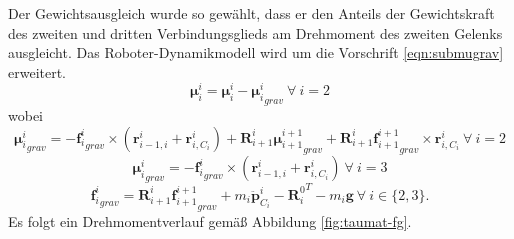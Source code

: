 %
Der Gewichtsausgleich wurde so gewählt, dass er den Anteils der Gewichtskraft des zweiten und dritten Verbindungsglieds am Drehmoment des zweiten Gelenks ausgleicht. 
Das Roboter-Dynamikmodell wird um die Vorschrift \ref{eqn:submugrav} erweitert.
%
\begin{equation}
	\label{eqn:submugrav}
\bm{\mu}^{i}_{i} = \bm{\mu}^{i}_{i} - {\bm{\mu}^{i}_{i}}_{grav} ~\forall ~i = 2
\end{equation}
%
wobei
%
\begin{equation}
	\label{eqn:mugrav}
	{\bm{\mu}^{i}_{i}}_{grav} = -{\bm{f}^{i}_{i}}_{grav} \times \left( \bm{r}^{i}_{i-1,i} + \bm{r}^{i}_{i,C_i} \right) + \bm{R}^{i}_{i+1} {\bm{\mu}^{i+1}_{i+1}}_{grav} + \bm{R}^{i}_{i+1} {\bm{f}^{i+1}_{i+1}}_{grav} \times \bm{r}^{i}_{i,C_i} ~\forall ~i = 2
\end{equation}
%
\begin{equation}
	\label{eqn:mugrav}
	{\bm{\mu}^{i}_{i}}_{grav} = -{\bm{f}^{i}_{i}}_{grav} \times \left( \bm{r}^{i}_{i-1,i} + \bm{r}^{i}_{i,C_i} \right) ~\forall ~i = 3
\end{equation}
%
\begin{equation}
	\label{eqn:subfgrav}
	{\bm{f}^{i}_{i}}_{grav} = \bm{R}^{i}_{i+1} {\bm{f}^{i+1}_{i+1}}_{grav} + m_i\ddot{\bm{p}}^{i}_{C_i} - {\bm{R}^0_i}^T - m_i \bm{g} ~\forall ~i \in \{2,3\}.
\end{equation}
%
Es folgt ein Drehmomentverlauf gemäß Abbildung \ref{fig:taumat-fg}. 
%
%
